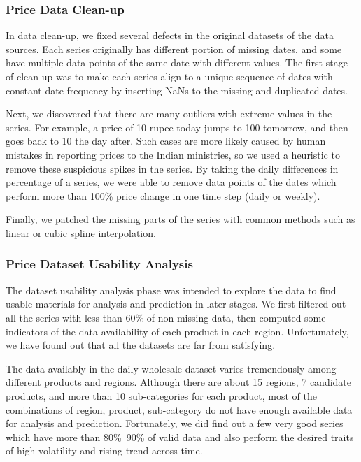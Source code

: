 \subsubsection*{Price Data Clean-up}
In data clean-up, we fixed several defects in the original datasets of the data sources. Each series originally has different portion of missing dates, and some have multiple data points of the same date with different values. The first stage of clean-up was to make each series align to a unique sequence of dates with constant date frequency by inserting NaNs to the missing and duplicated dates.

Next, we discovered that there are many outliers with extreme values in the series. For example, a price of 10 rupee today jumps to 100 tomorrow, and then goes back to 10 the day after. Such cases are more likely caused by human mistakes in reporting prices to the Indian ministries, so we used a heuristic to remove these suspicious spikes in the series. By taking the daily differences in percentage of a series, we were able to remove data points of the dates which perform more than 100\% price change in one time step (daily or weekly).

Finally, we patched the missing parts of the series with common methods such as linear or cubic spline interpolation.

\subsubsection*{Price Dataset Usability Analysis}

The dataset usability analysis phase was intended to explore the data to find usable materials for analysis and prediction in later stages. We first filtered out all the series with less than 60\% of non-missing data, then computed some indicators of the data availability of each product in each region. Unfortunately, we have found out that all the datasets are far from satisfying.

The data availably in the daily wholesale dataset varies tremendously among different products and regions. Although there are about 15 regions, 7 candidate products, and more than 10 sub-categories for each product, most of the combinations of region, product, sub-category do not have enough available data for analysis and prediction. Fortunately, we did find out a few very good series which have more than 80\%~90\% of valid data and also perform the desired traits of high volatility and rising trend across time.

